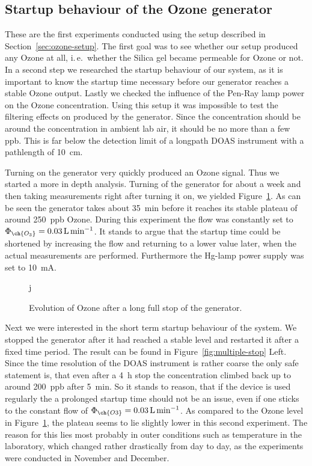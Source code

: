 \subsection{Startup behaviour of the Ozone generator}
\label{sec:ozone}

These are the first experiments conducted using the setup described in
Section~\ref{sec:ozone-setup}. The first goal was to see whether our
setup produced any Ozone at all, i.\,e.\ whether the Silica gel became
permeable for Ozone or not. In a second step we researched the startup
behaviour of our system, as it is important to know the startup time
necessary before our generator reaches a stable Ozone output. Lastly
we checked the influence of the Pen-Ray lamp power on the Ozone
concentration. Using this setup it was impossible to test the
filtering effects on  produced by the generator. Since the
concentration should be around the  concentration in ambient
lab air, it should be no more than a few \si{ppb}. This is far below
the detection limit of a longpath DOAS instrument with a pathlength of
\SI{10}{\centi\meter}. 

Turning on the generator very quickly produced an Ozone signal. Thus
we started a more in depth analysis. Turning of the generator for
about a week and then taking measurements right after turning it on,
we yielded Figure~\ref{fig:long-stop}. As can be seen the generator
takes about \SI{35}{\minute} before it reaches its stable plateau of
around \SI{250}{ppb} Ozone. During this experiment the flow was
constantly set to $\Phi_{\ch{O_3}} = \SI{0.03}{\liter\per\minute}$. It
stands to argue that the startup time could be shortened by increasing
the flow and returning to a lower value later, when the actual 
measurements are performed. Furthermore the Hg-lamp power supply was
set to \SI{10}{\milli\ampere}.

\begin{figure}[htbp]
  \centering
j  
  \caption{Evolution of Ozone after a long full stop of the
    generator.}
  \label{fig:long-stop}
\end{figure}

Next we were interested in the short term startup behaviour of the
system. We stopped the generator after it had reached a stable level
and restarted it after a fixed time period. The result can be found in
Figure~\ref{fig:multiple-stop} Left. Since the time resolution of the DOAS
instrument is rather coarse the only safe statement is, that even
after a \SI{4}{\hour} stop the concentration climbed back up to around
\SI{200}{ppb} after \SI{5}{\minute}. So it stands to reason, that if
the device is used regularly the a prolonged startup time should not
be an issue, even if one sticks to the constant flow of
$\Phi_{\ch{O3}} = \SI{0.03}{\liter\per\minute}$. As compared to the
Ozone level in Figure~\ref{fig:long-stop}, the plateau seems to lie
slightly lower in this second experiment. The reason for this lies
most probably in outer conditions such as temperature in the
laboratory, which changed rather drastically from day to day, as the
experiments were conducted in November and December.

